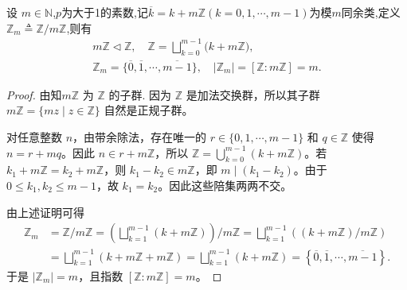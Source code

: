 \documentclass[../../main.tex]{subfiles}%
\begin{document}
\begin{proposition}\label{proposition:整数加群的商群}
设 \( m\in \mathbb{N}\),$p$为大于1的素数,记$\overline{k}= k + m\mathbb{Z}(k=0,1,\cdots,m-1)$为模$m$同余类,定义$\mathbb{Z}_m \triangleq \mathbb{Z} /m\mathbb{Z}$,则有
\begin{gather*}
m\mathbb{Z} \lhd \mathbb{Z} ,\quad \mathbb{Z} =\bigsqcup_{k=0}^{m-1}{(k}+m\mathbb{Z} ),
\\
\mathbb{Z} _m =\{\overline{0},\overline{1},\cdots ,\overline{m-1}\},\quad |\mathbb{Z} _m|=[\mathbb{Z} :m\mathbb{Z} ]=m.
\end{gather*}
\end{proposition}
\begin{proof}
由知\(m\mathbb{Z} \) 为 \( \mathbb{Z} \) 的子群.
因为 \(\mathbb{Z}\) 是加法交换群，所以其子群 \(m\mathbb{Z} = \{ mz \mid z \in \mathbb{Z} \}\) 自然是正规子群。

对任意整数 \(n\)，由带余除法，存在唯一的 \(r \in \{0,1,\cdots,m-1\}\) 和 \(q \in \mathbb{Z}\) 使得 \(n = r + mq\)。因此 \(n \in r + m\mathbb{Z}\)，所以 \(\mathbb{Z} = \bigcup_{k=0}^{m-1} (k + m\mathbb{Z})\)。若 \(k_1 + m\mathbb{Z} = k_2 + m\mathbb{Z}\)，则 \(k_1 - k_2 \in m\mathbb{Z}\)，即 \(m \mid (k_1 - k_2)\)。由于 \(0 \leqslant k_1,k_2 \leqslant m-1\)，故 \(k_1 = k_2\)。因此这些陪集两两不交。

由上述证明可得
\begin{align*}
\mathbb{Z} _m &= \mathbb{Z} /m\mathbb{Z} =\left( \bigsqcup_{k=1}^{m-1}{\left( k+m\mathbb{Z} \right)} \right) /m\mathbb{Z} =\bigsqcup_{k=1}^{m-1}{\left( \left( k+m\mathbb{Z} \right) /m\mathbb{Z} \right)}
\\
&=\bigsqcup_{k=1}^{m-1}{\left( k+m\mathbb{Z} +m\mathbb{Z} \right)}=\bigsqcup_{k=1}^{m-1}{\left( k+m\mathbb{Z} \right)}=\left\{ \overline{0},\overline{1},\cdots ,\overline{m-1} \right\} .
\end{align*}
于是 \(|\mathbb{Z}_m| = m\)，且指数 \([\mathbb{Z}:m\mathbb{Z}] = m\)。
\end{proof}
\end{document}
